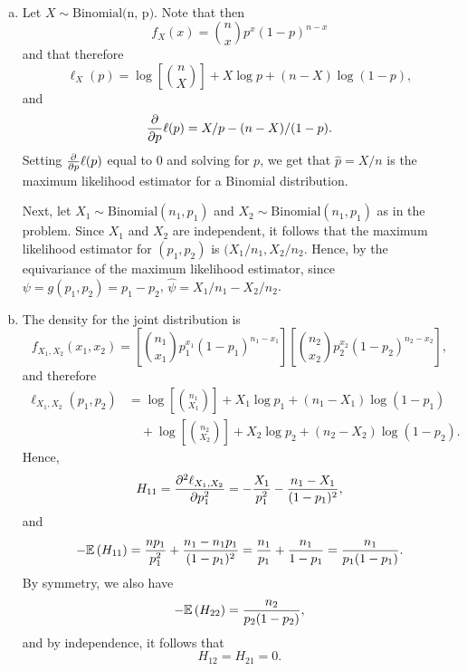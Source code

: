 \begin{ex}~
  \begin{enumerate}[(a)]
    \item Let $X\sim\text{Binomial(n, p)}$. Note that then
          \[
            f_{X}(x)=\binom{n}{x}p^x(1-p)^{n-x}
          \]
          and that therefore
          \[
            \ell_X(p)=\log\left[\binom{n}{X}\right]+X\log{p}+(n-X)\log(1-p),
          \]
          and
          \[
            \frac{\partial}{\partial p}\ell(p)=X/p-(n-X)/(1-p).
          \]
          Setting $\frac{\partial}{\partial p}\ell(p)$ equal to $0$ and solving for $p$,
          we get that $\widehat{p}=X/n$ is the maximum likelihood estimator
          for a Binomial distribution.

          Next, let $X_1\sim\text{Binomial}(n_1, p_1)$ and
          $X_2\sim\text{Binomial}(n_1, p_1)$ as in the problem. Since $X_1$ and
          $X_2$ are independent, it follows that the maximum likelihood
          estimator for $(p_1,p_2)$ is $(X_1/n_1, X_2/n_2$. Hence, by the
          equivariance of the maximum likelihood estimator, since
          $\psi=g(p_1,p_2)=p_1-p_2$, $\widehat{\psi}=X_1/n_1-X_2/n_2$.
    \item The density for the joint distribution is
          \[
            f_{X_1,X_2}(x_1,x_2)=
            \left[\binom{n_1}{x_1}p_1^{x_1}(1-p_1)^{n_1-x_1}\right]
            \left[\binom{n_2}{x_2}p_2^{x_2}(1-p_2)^{n_2-x_2}\right],
          \]
          and therefore
          \begin{align*}
            \ell_{X_1,X_2}(p_1,p_2)
             & =\log\left[\binom{n_1}{X_1}\right]+X_1\log{p_1}+(n_1-X_1)\log(1-p_1)       \\
             & \quad+\log\left[\binom{n_2}{X_2}\right]+X_2\log{p_2}+(n_2-X_2)\log(1-p_2).
          \end{align*}
          Hence,
          \begin{align*}
            H_{11}
            =\frac{\partial^2 \ell_{X_1,X_2}}{\partial p_1^2}
            =-\frac{X_1}{p_1^2}-\frac{n_1-X_1}{(1-p_1)^2},
          \end{align*}
          and
          \begin{align*}
            -\mathbb{E}\left(H_{11}\right)
            =\frac{np_1}{p_1^2}+\frac{n_1-n_1p_1}{(1-p_1)^2}
            =\frac{n_1}{p_1}+\frac{n_1}{1-p_1}
            =\frac{n_1}{p_1(1-p_1)}.
          \end{align*}
          By symmetry, we also have
          \[
            -\mathbb{E}\left(H_{22}\right)
            =\frac{n_2}{p_2(1-p_2)},
          \]
          and by independence, it follows that
          \[
            H_{12}=H_{21}=0.
          \]


\end{enumerate}
\end{ex}
